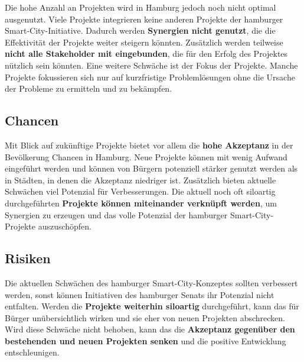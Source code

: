 Die hohe Anzahl an Projekten wird in Hamburg jedoch noch nicht optimal ausgenutzt. Viele Projekte integrieren keine anderen Projekte der hamburger Smart-City-Initiative. Dadurch werden \textbf{Synergien nicht genutzt}, die die Effektivität der Projekte weiter steigern könnten. Zusätzlich werden teilweise \textbf{nicht alle Stakeholder mit eingebunden}, die für den Erfolg des Projektes nützlich sein könnten. Eine weitere Schwäche ist der Fokus der Projekte. Manche Projekte fokussieren sich nur auf kurzfristige Problemlösungen ohne die Ursache der Probleme zu ermitteln und zu bekämpfen.

\subsection{Chancen}

Mit Blick auf zukünftige Projekte bietet vor allem die \textbf{hohe Akzeptanz }in der Bevölkerung Chancen in Hamburg. Neue Projekte können mit wenig Aufwand eingeführt werden und können von Bürgern potenziell stärker genutzt werden als in Städten, in denen die Akzeptanz niedriger ist. Zusätzlich bieten aktuelle Schwächen viel Potenzial für Verbesserungen. Die aktuell noch oft siloartig durchgeführten \textbf{Projekte können miteinander verknüpft werden}, um Synergien zu erzeugen und das volle Potenzial der hamburger Smart-City-Projekte auszuschöpfen.

\subsection{Risiken}

Die aktuellen Schwächen des hamburger Smart-City-Konzeptes sollten verbessert werden, sonst können Initiativen des hamburger Senats ihr Potenzial nicht entfalten. Werden die \textbf{Projekte weiterhin siloartig }durchgeführt, kann das für Bürger unübersichtlich wirken und sie eher von neuen Projekten abschrecken. Wird diese Schwäche nicht behoben, kann das die \textbf{Akzeptanz gegenüber den bestehenden und neuen Projekten senken} und die positive Entwicklung entschleunigen.


